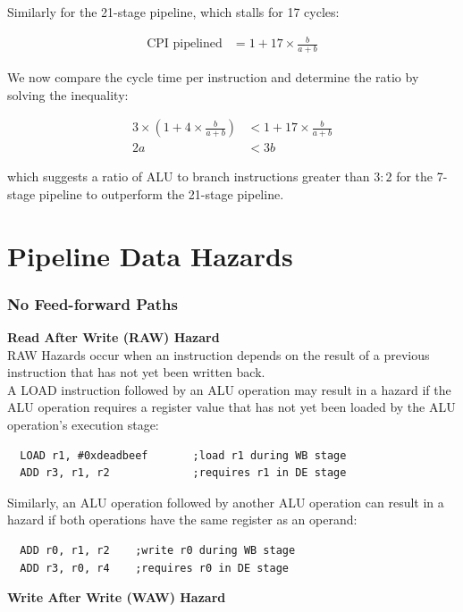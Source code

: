 \documentclass[a4paper, 12pt, oneside]{book}
\begin{document}
Similarly for the 21-stage pipeline, which stalls for 17 cycles:

\begin{align*}
  \text{CPI pipelined} & = 1 + 17 \times \frac{b}{a+b}
\end{align*}

We now compare the cycle time per instruction and determine the ratio by solving the inequality:

\begin{align*}
  3 \times  \left(1 + 4 \times \frac{b}{a+b}\right) & < 1 + 17 \times \frac{b}{a+b} \\
  2a                                                & < 3b
\end{align*}

which suggests a ratio of ALU to branch instructions greater than $3:2$ for the 7-stage pipeline to outperform the 21-stage pipeline.

\section{Pipeline Data Hazards}

\subsubsection{No Feed-forward Paths}

\textbf{Read After Write (RAW) Hazard}\\

RAW Hazards occur when an instruction depends on the result of a previous instruction that has not yet been written back.\\

A LOAD instruction followed by an ALU operation may result in a hazard if the ALU operation requires a register value that has not yet been loaded by the ALU operation's execution stage:
\begin{verbatim}
  LOAD r1, #0xdeadbeef       ;load r1 during WB stage
  ADD r3, r1, r2             ;requires r1 in DE stage
\end{verbatim}

Similarly, an ALU operation followed by another ALU operation can result in a hazard if both operations have the same register as an operand:
\begin{verbatim}
  ADD r0, r1, r2    ;write r0 during WB stage
  ADD r3, r0, r4    ;requires r0 in DE stage
\end{verbatim}

\textbf{Write After Write (WAW) Hazard}\\
\end{document}
